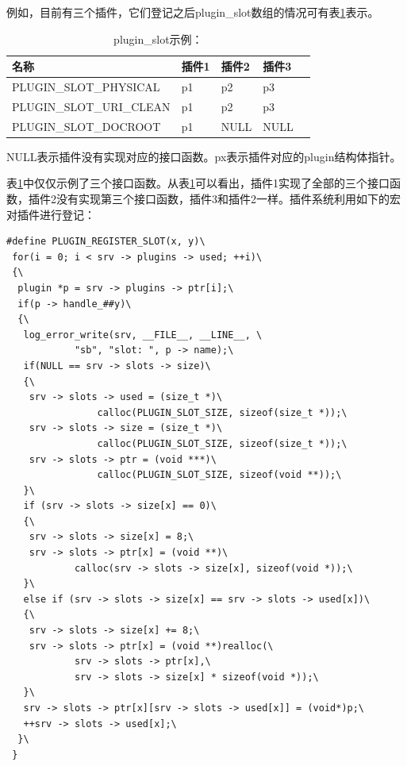 \documentclass[12pt, twoside, a4paper, xetex]{report}
\begin{document}
	例如，目前有三个插件，它们登记之后plugin\_slot数组的情况可有表\ref{example_plugin}表示。
	\begin{table}[htbp]
	\caption{plugin\_slot示例：}
	\label{example_plugin}
	\centering
	\begin{tabularx}{\textwidth}{p{6cm}XXXl} %
	\toprule
	\centering 名称 & \centering  插件1 & \centering  插件2 &\centering 插件3&\\
	\midrule
	\centering PLUGIN\_SLOT\_PHYSICAL &\centering  p1 &\centering  p2 &\centering  p3&\\
	\centering PLUGIN\_SLOT\_URI\_CLEAN &\centering  p1 &\centering  p2 &\centering  p3&\\
	\centering PLUGIN\_SLOT\_DOCROOT &\centering  p1 & \centering NULL & \centering NULL&\\
	\bottomrule
	\end{tabularx}
	\end{table}
	
	NULL表示插件没有实现对应的接口函数。px表示插件对应的plugin结构体指针。
	
	表\ref{example_plugin}中仅仅示例了三个接口函数。从表\ref{example_plugin}可以看出，插件1实现了全部的三个接口函数，插件2没有实现第三个接口函数，插件3和插件2一样。插件系统利用如下的宏对插件进行登记：
	
\begin{verbatim}
#define PLUGIN_REGISTER_SLOT(x, y)\
 for(i = 0; i < srv -> plugins -> used; ++i)\
 {\
  plugin *p = srv -> plugins -> ptr[i];\
  if(p -> handle_##y)\
  {\
   log_error_write(srv, __FILE__, __LINE__, \
   			"sb", "slot: ", p -> name);\
   if(NULL == srv -> slots -> size)\
   {\
    srv -> slots -> used = (size_t *)\
    			calloc(PLUGIN_SLOT_SIZE, sizeof(size_t *));\
    srv -> slots -> size = (size_t *)\
    			calloc(PLUGIN_SLOT_SIZE, sizeof(size_t *));\
	srv -> slots -> ptr = (void ***)\
				calloc(PLUGIN_SLOT_SIZE, sizeof(void **));\
   }\
   if (srv -> slots -> size[x] == 0)\
   {\
	srv -> slots -> size[x] = 8;\
	srv -> slots -> ptr[x] = (void **)\
			calloc(srv -> slots -> size[x], sizeof(void *));\
   }\
   else if (srv -> slots -> size[x] == srv -> slots -> used[x])\
   {\
	srv -> slots -> size[x] += 8;\
	srv -> slots -> ptr[x] = (void **)realloc(\
			srv -> slots -> ptr[x],\
			srv -> slots -> size[x] * sizeof(void *));\
   }\
   srv -> slots -> ptr[x][srv -> slots -> used[x]] = (void*)p;\
   ++srv -> slots -> used[x];\
  }\
 }
\end{verbatim}
	
\end{document}
